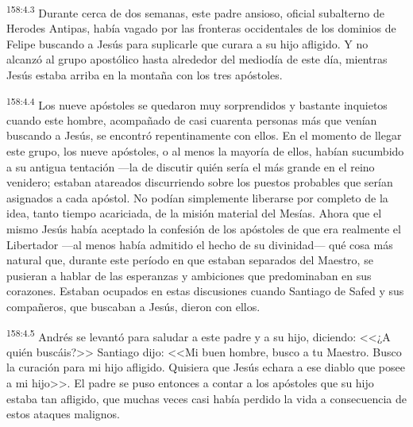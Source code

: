 \par 
\textsuperscript{158:4.3} Durante cerca de dos semanas, este padre ansioso, oficial subalterno de Herodes Antipas, había vagado por las fronteras occidentales de los dominios de Felipe buscando a Jesús para suplicarle que curara a su hijo afligido. Y no alcanzó al grupo apostólico hasta alrededor del mediodía de este día, mientras Jesús estaba arriba en la montaña con los tres apóstoles.

\par 
\textsuperscript{158:4.4} Los nueve apóstoles se quedaron muy sorprendidos y bastante inquietos cuando este hombre, acompañado de casi cuarenta personas más que venían buscando a Jesús, se encontró repentinamente con ellos. En el momento de llegar este grupo, los nueve apóstoles, o al menos la mayoría de ellos, habían sucumbido a su antigua tentación ---la de discutir quién sería el más grande en el reino venidero; estaban atareados discurriendo sobre los puestos probables que serían asignados a cada apóstol. No podían simplemente liberarse por completo de la idea, tanto tiempo acariciada, de la misión material del Mesías. Ahora que el mismo Jesús había aceptado la confesión de los apóstoles de que era realmente el Libertador ---al menos había admitido el hecho de su divinidad--- qué cosa más natural que, durante este período en que estaban separados del Maestro, se pusieran a hablar de las esperanzas y ambiciones que predominaban en sus corazones. Estaban ocupados en estas discusiones cuando Santiago de Safed y sus compañeros, que buscaban a Jesús, dieron con ellos.

\par 
\textsuperscript{158:4.5} Andrés se levantó para saludar a este padre y a su hijo, diciendo: <<¿A quién buscáis?>> Santiago dijo: <<Mi buen hombre, busco a tu Maestro. Busco la curación para mi hijo afligido. Quisiera que Jesús echara a ese diablo que posee a mi hijo>>. El padre se puso entonces a contar a los apóstoles que su hijo estaba tan afligido, que muchas veces casi había perdido la vida a consecuencia de estos ataques malignos.

